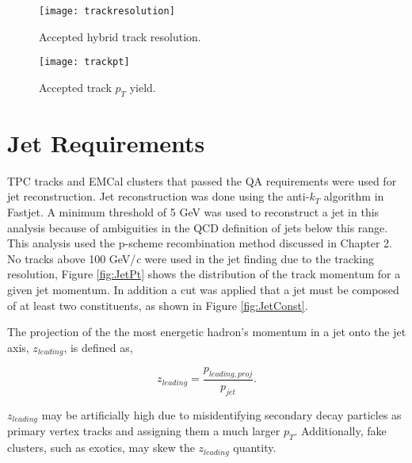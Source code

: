 \begin{figure}[h]
\texttt{[image: trackresolution]}
\centering
\caption{Accepted hybrid track resolution.}
\label{fig:trackresolution}
\end{figure}

\begin{figure}[h]
\texttt{[image: trackpt]}
\centering
\caption{Accepted track $p_{T}$ yield.}
\label{fig:hybtrackpt}
\end{figure}


\section{Jet Requirements}

TPC tracks and EMCal clusters that passed the QA requirements were used for jet reconstruction. Jet reconstruction was done using the anti-$k_{T}$ algorithm in Fastjet.  A minimum threshold of 5 GeV was used to reconstruct a jet in this analysis because of ambiguities in the QCD definition of jets below this range.  This analysis used the p-scheme recombination method discussed in Chapter 2. No tracks above 100 GeV/\textit{c} were used in the jet finding due to the tracking resolution, Figure \ref{fig:JetPt} shows the distribution of the track momentum for a given jet momentum.  In addition a cut was applied that a jet must be composed of at least two constituents, as shown in Figure \ref{fig:JetConst}.


The projection of the the most energetic hadron's momentum in a jet onto the jet axis, $z_{leading}$, is defined as,

\begin{equation}
z_{leading} = \frac{ p_{leading, proj} }{ p_{jet} }.
\label{eq:zleading}
\end{equation}

\noindent
$z_{leading}$ may be artificially high due to misidentifying secondary decay particles as primary vertex tracks and assigning them a much larger $p_{T}$.  Additionally, fake clusters, such as exotics, may skew the $z_{leading}$ quantity.  

